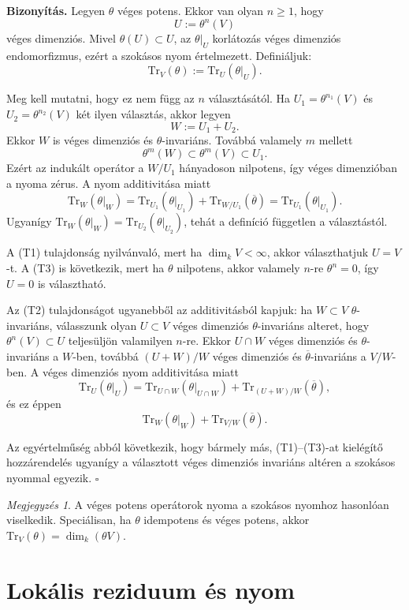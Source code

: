 \documentclass[a4paper,12pt]{article}
\theoremstyle{definition}
\newenvironment{biz}{\par\noindent\textbf{Bizonyítás.}\enspace\ignorespaces}
{\hfill$\square$\par}
\theoremstyle{plain}
\theoremstyle{remark}
\newtheorem{remark}[theorem]{Megjegyzés}
\newcommand{\Tr}{\mathrm{Tr}}
\begin{document}
\begin{biz}
Legyen $\theta$ véges potens. Ekkor van olyan $n\ge 1$, hogy
\[
U:=\theta^n(V)
\]
véges dimenziós. Mivel $\theta(U)\subset U$, az $\theta|_U$ korlátozás véges dimenziós endomorfizmus, ezért a szokásos nyom értelmezett. Definiáljuk:
\[
\Tr_V(\theta):=\Tr_U(\theta|_U).
\]

Meg kell mutatni, hogy ez nem függ az $n$ választásától. Ha $U_1=\theta^{n_1}(V)$ és $U_2=\theta^{n_2}(V)$ két ilyen választás, akkor legyen
\[
W:=U_1+U_2.
\]
Ekkor $W$ is véges dimenziós és $\theta$-invariáns. Továbbá valamely $m$ mellett
\[
\theta^m(W)\subset \theta^m(V)\subset U_1.
\]
Ezért az indukált operátor a $W/U_1$ hányadoson nilpotens, így véges dimenzióban a nyoma zérus. A nyom additivitása miatt
\[
\Tr_W(\theta|_W)=\Tr_{U_1}(\theta|_{U_1})+\Tr_{W/U_1}(\overline{\theta})
=\Tr_{U_1}(\theta|_{U_1}).
\]
Ugyanígy $\Tr_W(\theta|_W)=\Tr_{U_2}(\theta|_{U_2})$, tehát a definíció független a választástól.

A (T1) tulajdonság nyilvánvaló, mert ha $\dim_k V<\infty$, akkor választhatjuk $U=V$-t. A (T3) is következik, mert ha $\theta$ nilpotens, akkor valamely $n$-re $\theta^n=0$, így $U=0$ is választható.

Az (T2) tulajdonságot ugyanebből az additivitásból kapjuk: ha $W\subset V$ $\theta$-invariáns, válasszunk olyan $U\subset V$ véges dimenziós $\theta$-invariáns alteret, hogy $\theta^n(V)\subset U$ teljesüljön valamilyen $n$-re. Ekkor $U\cap W$ véges dimenziós és $\theta$-invariáns a $W$-ben, továbbá $(U+W)/W$ véges dimenziós és $\overline{\theta}$-invariáns a $V/W$-ben. A véges dimenziós nyom additivitása miatt
\[
\Tr_U(\theta|_U)
=
\Tr_{U\cap W}(\theta|_{U\cap W})
+
\Tr_{(U+W)/W}(\overline{\theta}),
\]
és ez éppen
\[
\Tr_W(\theta|_W)+\Tr_{V/W}(\overline{\theta}).
\]

Az egyértelműség abból következik, hogy bármely más, (T1)–(T3)-at kielégítő hozzárendelés ugyanígy a választott véges dimenziós invariáns altéren a szokásos nyommal egyezik.
\end{biz}

\begin{remark}
A véges potens operátorok nyoma a szokásos nyomhoz hasonlóan viselkedik. Speciálisan, ha $\theta$ idempotens és véges potens, akkor $\Tr_V(\theta)=\dim_k(\theta V)$.
\end{remark}
\section{Lokális reziduum és nyom}
\end{document}

